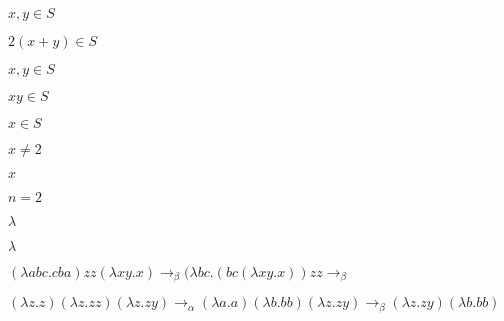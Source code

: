 \documentclass[10pt]{book}
\begin{document}
\begin{mdSnippets}
\begin{mdInlineSnippet}%
$x,y \in S$\end{mdInlineSnippet}%
\begin{mdInlineSnippet}[6338e2a865b2a588ab4cf36c8edb1d85]%
$2(x+y) \in S$\end{mdInlineSnippet}%
\begin{mdInlineSnippet}%
$x,y \in S$\end{mdInlineSnippet}%
\begin{mdInlineSnippet}[94ab0a60ff9cfe6ad27f8238d7e0f075]%
$xy \in S$\end{mdInlineSnippet}%
\begin{mdInlineSnippet}%
$x \in S$\end{mdInlineSnippet}%
\begin{mdInlineSnippet}%
$x \not=2$\end{mdInlineSnippet}%
\begin{mdInlineSnippet}[9dd4e461268c8034f5c8564e155c67a6]%
$x$\end{mdInlineSnippet}%
\begin{mdInlineSnippet}[701653d734e23ac51c25137fb8831ba8]%
$n = 2$\end{mdInlineSnippet}%
\begin{mdInlineSnippet}[c6a6eb61fd9c6c913da73b3642ca147d]%
$\lambda$\end{mdInlineSnippet}%
\begin{mdInlineSnippet}[c6a6eb61fd9c6c913da73b3642ca147d]%
$\lambda$\end{mdInlineSnippet}%
\begin{mdInlineSnippet}%
$(\lambda a b c . c b a)zz(\lambda x y . x) \rightarrow_\beta (\lambda b c . (b c (\lambda x y . x))zz\rightarrow_\beta $\end{mdInlineSnippet}%
\begin{mdInlineSnippet}[241692a21e2a7536562299a1d06d7e5a]%
$(\lambda z . z)(\lambda z . z z)(\lambda z . z y) \rightarrow_\alpha (\lambda a . a)(\lambda b . b b)(\lambda z . z y) \rightarrow_\beta (\lambda z . z y)(\lambda b . bb)$\end{mdInlineSnippet}%

\end{mdSnippets}
\end{document}
